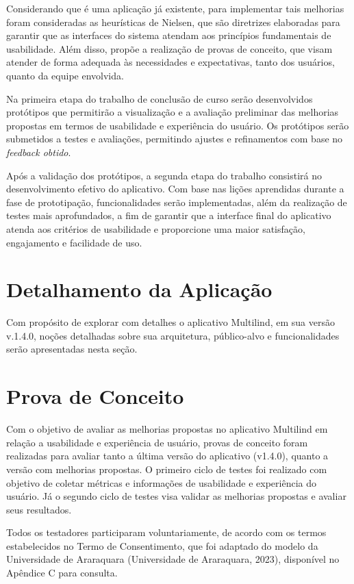 Considerando que é uma aplicação já existente, para implementar tais melhorias foram consideradas as heurísticas de Nielsen, que são diretrizes elaboradas para garantir que as interfaces do sistema atendam aos princípios 
fundamentais de usabilidade. Além disso, propõe a realização de provas de conceito, que visam atender de forma adequada às necessidades e expectativas, tanto dos usuários, quanto da equipe envolvida.

Na primeira etapa do trabalho de conclusão de curso serão desenvolvidos protótipos que permitirão a visualização e a avaliação preliminar das melhorias propostas em termos de usabilidade e experiência do usuário. Os protótipos 
serão submetidos a testes e avaliações, permitindo ajustes e refinamentos com base no \textit{feedback obtido}. 

Após a validação dos protótipos, a segunda etapa do trabalho consistirá no desenvolvimento efetivo do aplicativo. Com base nas lições aprendidas durante a fase de prototipação, funcionalidades serão implementadas, além da realização 
de testes mais aprofundados, a fim de garantir que a interface final do aplicativo atenda aos critérios de usabilidade e proporcione uma maior satisfação, engajamento e facilidade de uso.

\section{Detalhamento da Aplicação}
\label{sec:Detalhamento da Aplicacao}
Com propósito de explorar com detalhes o aplicativo Multilind, em sua versão v.1.4.0, noções detalhadas sobre sua arquitetura, público-alvo e funcionalidades serão apresentadas nesta seção. 	

\section{Prova de Conceito}
\label{sec:Prova de Conceito}
Com o objetivo de avaliar as melhorias propostas no aplicativo Multilind em relação a usabilidade e experiência de usuário, provas de conceito foram 
realizadas para avaliar tanto a última versão do aplicativo (v1.4.0), quanto a versão com melhorias propostas. O primeiro ciclo de testes foi realizado 
com objetivo de coletar métricas e informações de usabilidade e experiência do usuário. Já o segundo ciclo de testes visa validar as melhorias propostas e avaliar seus resultados.

Todos os testadores participaram voluntariamente, de acordo com os termos estabelecidos no Termo de Consentimento, que foi adaptado do 
modelo da Universidade de Araraquara (Universidade de Araraquara, 2023), disponível no Apêndice C para consulta.

